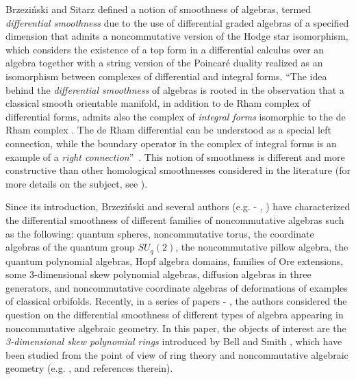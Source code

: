 \documentclass{amsart}
\theoremstyle{definition}
\theoremstyle{remark}
\numberwithin{equation}{section}
\begin{document}
Brzezi{\'n}ski and Sitarz \cite{BrzezinskiSitarz2017} defined a notion of smoothness of algebras, termed {\em differential smoothness} due to the use of differential graded algebras of a specified dimension that admits a noncommutative version of the Hodge star isomorphism, which considers the existence of a top form in a differential calculus over an algebra together with a string version of the Poincar\'e duality realized as an
isomorphism between complexes of differential and integral forms. \textquotedblleft The idea behind the {\em differential smoothness} of algebras is rooted in the observation that a classical smooth orientable manifold, in addition to de Rham complex of differential forms, admits also the complex of {\em integral forms} isomorphic to the de Rham complex \cite[Section 4.5]{Manin1997}. The de Rham differential can be understood as a special left connection, while the boundary operator in the complex of integral forms is an example of a {\em right connection}\textquotedblright\ \cite[p. 413]{BrzezinskiSitarz2017}. This notion of smoothness is different and more constructive than other homological smoothnesses considered in the literature (for more details on the subject, see \cite{Brzezinski2008, Brzezinski2014, CuntzQuillen1995, Grothendieck1964, Krahmer2012, Schelter1986, StaffordZhang1994, VandenBergh1998}).

Since its introduction, Brzezi{\'n}ski and several authors (e.g. \cite{Brzezinski2015} - \cite{BrzezinskiSitarz2017}, \cite{DuboisViolette1988, DuboisVioletteKernerMadore1990, Karacuha2015, KaracuhaLomp2014, ReyesSarmiento2022}) have characterized the differential smoothness of different families of noncommutative algebras such as the following: quantum spheres, noncommutative torus, the coordinate algebras of the quantum group $SU_q(2)$, the noncommutative pillow algebra, the quantum polynomial algebras, Hopf algebra domains, families of Ore extensions, some 3-dimensional skew polynomial algebras, diffusion algebras in three generators, and noncommutative coordinate algebras of deformations of examples of classical orbifolds. Recently, in a series of papers \cite{Rubiano2026} - \cite{RubianoReyes2025BAG}, the authors considered the question on the differential smoothness of different types of algebra appearing in noncommutative algebraic geometry. In this paper, the objects of interest are the {\em 3-dimensional skew polynomial rings} introduced by Bell and Smith \cite{BellSmith1990}, which have been studied from the point of view of ring theory and noncommutative algebraic geometry (e.g. \cite{ChaconReyes2025, Fajardoetal2020, NinoReyes2025, RedmanPhDThesis1996, Redman1999, ReyesRodriguez2021, ReyesSuarez20173D, Rosenberg1995}, and references therein). 
\end{document}
